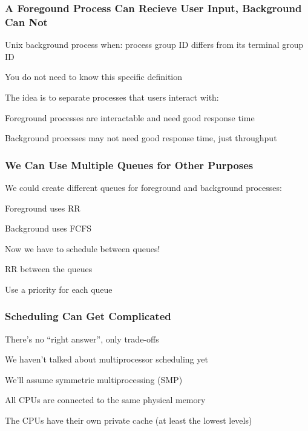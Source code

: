   \begin{frame}
    \frametitle{A Foregound Process Can Recieve User Input, Background Can Not}

    Unix background process when: process group ID differs from its terminal group ID

    \hspace{2em} You do not need to know this specific definition

    \vspace{2em}

    The idea is to separate processes that users interact with:

    \hspace{2em} Foreground processes are interactable and need good response time

    \hspace{2em} Background processes may not need good response time, just throughput
  \end{frame}

  \begin{frame}
    \frametitle{We Can Use Multiple Queues for Other Purposes}

    We could create different queues for foreground and background processes:

    \hspace{2em} Foreground uses RR

    \hspace{2em} Background uses FCFS

    \vspace{2em}

    Now we have to schedule between queues!

    \hspace{2em} RR between the queues

    \hspace{2em} Use a priority for each queue
  \end{frame}

  \begin{frame}
    \frametitle{Scheduling Can Get Complicated}

    There's no ``right answer'', only trade-offs

    \vspace{2em}

    We haven't talked about multiprocessor scheduling yet

    \vspace{2em}

    We'll assume symmetric multiprocessing (SMP)

    \hspace{2em} All CPUs are connected to the same physical memory

    \hspace{2em} The CPUs have their own private cache (at least the lowest levels)
  \end{frame}

